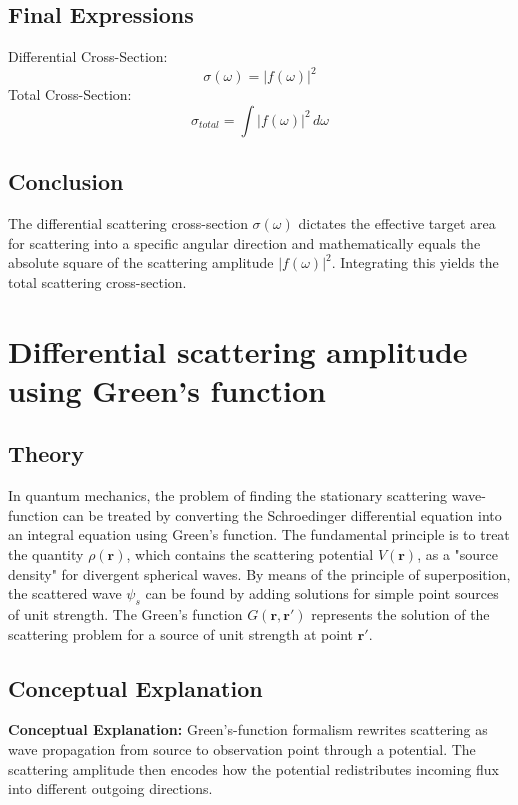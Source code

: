 \documentclass[12pt]{report}
\begin{document}
\subsection*{Final Expressions}
Differential Cross-Section:
\begin{equation}
\boxed{ \sigma(\omega) = |f(\omega)|^2 }
\end{equation}
Total Cross-Section:
\begin{equation}
\boxed{ \sigma_{total} = \int |f(\omega)|^2 \, d\omega }
\end{equation}

\subsection*{Conclusion}
The differential scattering cross-section $\sigma(\omega)$ dictates the effective target area for scattering into a specific angular direction and mathematically equals the absolute square of the scattering amplitude $|f(\omega)|^2$. Integrating this yields the total scattering cross-section.

\section{Differential scattering amplitude using Green's function}



\subsection*{Theory}
In quantum mechanics, the problem of finding the stationary scattering wave-function can be treated by converting the Schroedinger differential equation into an integral equation using Green's function. The fundamental principle is to treat the quantity $\rho(\mathbf{r})$, which contains the scattering potential $V(\mathbf{r})$, as a "source density" for divergent spherical waves. By means of the principle of superposition, the scattered wave $\psi_s$ can be found by adding solutions for simple point sources of unit strength. The Green's function $G(\mathbf{r}, \mathbf{r}')$ represents the solution of the scattering problem for a source of unit strength at point $\mathbf{r}'$.


\subsection{Conceptual Explanation}
\textbf{Conceptual Explanation:} Green's-function formalism rewrites scattering as wave propagation from source to observation point through a potential. The scattering amplitude then encodes how the potential redistributes incoming flux into different outgoing directions.
\end{document}
